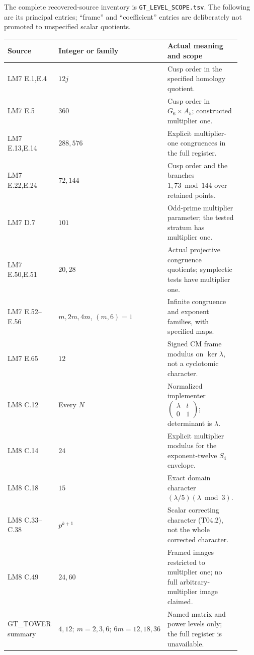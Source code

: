 The complete recovered-source inventory is
\texttt{GT\_LEVEL\_SCOPE.tsv}. The following are its principal entries;
``frame'' and ``coefficient'' entries are deliberately not promoted
to unspecified scalar quotients.
\begin{center}
\begin{tabular}{p{0.24\linewidth}p{0.23\linewidth}p{0.45\linewidth}}
\hline
Source & Integer or family & Actual meaning and scope\\\hline
LM7 E.1,E.4 & $12j$ & Cusp order in the specified homology quotient.\\
LM7 E.5 & $360$ & Cusp order in $G_6\times A_5$; constructed multiplier one.\\
LM7 E.13,E.14 & $288,576$ & Explicit multiplier-one congruences in the full register.\\
LM7 E.22,E.24 & $72,144$ & Cusp order and the branches $1,73\bmod144$ over retained points.\\
LM7 D.7 & $101$ & Odd-prime multiplier parameter; the tested stratum has multiplier one.\\
LM7 E.50,E.51 & $20,28$ & Actual projective congruence quotients; symplectic tests have multiplier one.\\
LM7 E.52--E.56 & $m,2m,4m$, $(m,6)=1$ & Infinite congruence and exponent families, with specified maps.\\
LM7 E.65 & $12$ & Signed CM frame modulus on $\ker\lambda$, not a cyclotomic character.\\
LM8 C.12 & Every $N$ & Normalized implementer $\left(\begin{smallmatrix}\lambda&t\\0&1\end{smallmatrix}\right)$; determinant is $\lambda$.\\
LM8 C.14 & $24$ & Explicit multiplier modulus for the exponent-twelve $S_4$ envelope.\\
LM8 C.18 & $15$ & Exact domain character $(\lambda/5)(\lambda\bmod3)$.\\
LM8 C.33--C.38 & $p^{k+1}$ & Scalar correcting character (T04.2), not the whole corrected character.\\
LM8 C.49 & $24,60$ & Framed images restricted to multiplier one; no full arbitrary-multiplier image claimed.\\
GT\_TOWER summary & $4,12;\ m=2,3,6;\ 6m=12,18,36$ & Named matrix and power levels only; the full register is unavailable.\\\hline
\end{tabular}
\end{center}

